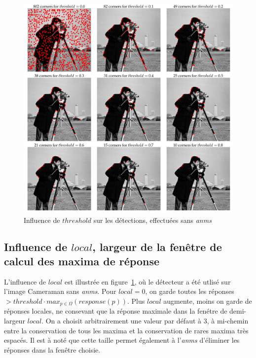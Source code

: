 \documentclass[12pt,a4paper,onecolumn]{article}
\begin{document}
\begin{figure}[H]
	\centering
	\includegraphics[width = 1.0\textwidth]{2_cameraman_threshold}
	\caption{Influence de \(threshold\) sur les détections, effectuées sans \textit{anms}}
	\label{fig_2_threshold}
\end{figure}

\subsection{Influence de \(local\), largeur de la fenêtre de calcul des maxima de réponse}

L'influence de \(local\) est illustrée en figure~\ref{fig_2_threshold}, où le détecteur a été utlisé sur l'image Cameraman sans \textit{anms}. Pour \(local = 0\), on garde toutes les réponses \(> threshold \cdot max_{p \in \Omega}(response(p))\). Plus \(local\) augmente, moins on garde de réponses locales, ne consevant que la réponse maximale dans la fenétre de demi-largeur \(local\). On a choisit arbitrairement une valeur par défaut à 3, à mi-chemin entre la conservation de tous les maxima et la conservation de rares maxima très espacés. Il est à noté que cette taille permet également à l'\textit{anms} d'éliminer les réponses dans la fenêtre choisie.
\end{document}
